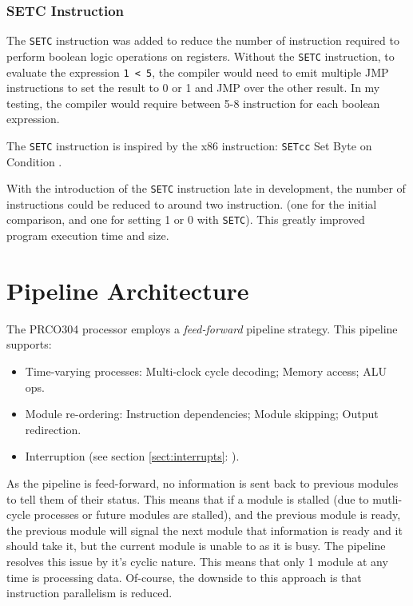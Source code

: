 \documentclass[11pt,a4paper]{report}
\newcommand{\scname}{PRCO304}
\begin{document}
\subsubsection*{SETC Instruction}
The \verb|SETC| instruction was added to reduce the number of instruction required to perform boolean logic operations on registers. Without the \verb|SETC| instruction, to evaluate the expression \texttt{1 < 5}, the compiler would need to emit multiple JMP instructions to set the result to 0 or 1 and JMP over the other result. In my testing, the compiler would require between 5-8 instruction for each boolean expression. 

The \verb|SETC| instruction is inspired by the x86 instruction: \verb|SETcc| Set Byte on Condition \citep{isa_x86}.

With the introduction of the \verb|SETC| instruction late in development, the number of instructions could be reduced to around two instruction. (one for the initial comparison, and one for setting 1 or 0 with \verb|SETC|). This greatly improved program execution time and size.

\section{Pipeline Architecture}
The \scname{} processor employs a \textit{feed-forward} pipeline strategy. 
This pipeline supports:
\begin{itemize}
\item{Time-varying processes: Multi-clock cycle decoding; Memory access; ALU ops.}
\item{Module re-ordering: Instruction dependencies; Module skipping; Output redirection. }
\item{Interruption (see section \ref{sect:interrupts}: {}).}
\end{itemize}

As the pipeline is feed-forward, no information is sent back to previous modules to tell them of their status. This means that if a module is stalled (due to mutli-cycle processes or future modules are stalled), and the previous module is ready, the previous module will signal the next module that information is ready and it should take it, but the current module is unable to as it is busy. The pipeline resolves this issue by it's cyclic nature. This means that only 1 module at any time is processing data. Of-course, the downside to this approach is that instruction parallelism is reduced.
\end{document}
